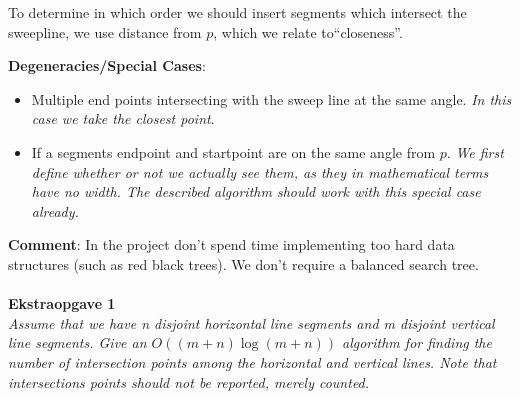 To determine in which order we should insert segments which intersect the sweepline, we use distance from $p$, which we relate to``closeness''.

\noindent
\textbf{Degeneracies/Special Cases}:
\begin{itemize}
	\item Multiple end points intersecting with the sweep line at the same angle. \textit{In this case we take the closest point}.
	\item If a segments endpoint and startpoint are on the same angle from $p$. \textit{We first define whether or not we actually see them, as they in mathematical terms have no width. The described algorithm should work with this special case already.}
\end{itemize}

\textbf{Comment}: In the project don't spend time implementing too hard data structures (such as red black trees). We don't require a balanced search tree.
\\\\
\noindent
\textbf{Ekstraopgave 1}\\
\noindent
\textit{Assume that we have n disjoint horizontal line segments and m disjoint vertical line segments. Give an $O((m+n)\log(m+n))$ algorithm for finding the number of intersection points among the horizontal and vertical lines. Note that intersections points should not be reported, merely counted.}

